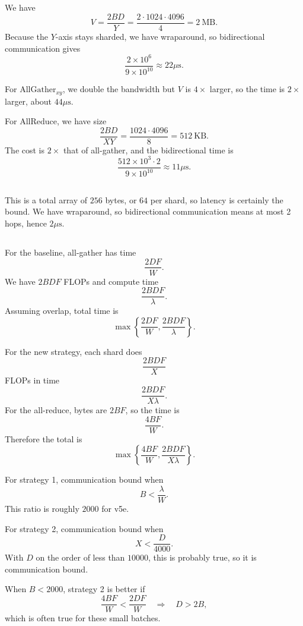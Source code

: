 \documentclass[11pt]{article}
\newcommand{\B}{B}
\newcommand{\D}{D}
\newcommand{\F}{F}
\newcommand{\W}{W}
\newcommand{\lam}{\lambda}
\newcommand{\us}{\mu\mathrm{s}}
\newcommand{\exercisebreak}{\Needspace{8\baselineskip}}
\begin{document}
\exercisebreak
\subsection{}
We have
\[
  V=\frac{2\B\D}{Y}
  =
  \frac{2\cdot 1024\cdot 4096}{4}
  =
  2\ \mathrm{MB}.
\]
Because the $Y$-axis stays sharded, we have wraparound, so bidirectional communication gives
\[
  \frac{2\times 10^6}{9\times 10^{10}}\approx 22\us.
\]

For $\mathrm{AllGather}_{xy}$, we double the bandwidth but $V$ is $4\times$ larger, so the time is $2\times$ larger, about $44\us$.

For $\mathrm{AllReduce}$, we have size
\[
  \frac{2\B\D}{XY}
  =
  \frac{1024\cdot 4096}{8}
  =
  512\ \mathrm{KB}.
\]
The cost is $2\times$ that of all-gather, and the bidirectional time is
\[
  \frac{512\times 10^3\cdot 2}{9\times 10^{10}}\approx 11\us.
\]

\exercisebreak
\subsection{}
This is a total array of $256$ bytes, or $64$ per shard, so latency is certainly the bound. We have wraparound, so bidirectional communication means at most 2 hops, hence $2\us$.

\exercisebreak
\subsection{}
For the baseline, all-gather has time
\[
  \frac{2\D\F}{\W}.
\]
We have $2\B\D\F$ FLOPs and compute time
\[
  \frac{2\B\D\F}{\lam}.
\]
Assuming overlap, total time is
\[
  \max\left\{\frac{2\D\F}{\W},\frac{2\B\D\F}{\lam}\right\}.
\]

For the new strategy, each shard does
\[
  \frac{2\B\D\F}{X}
\]
FLOPs in time
\[
  \frac{2\B\D\F}{X\lam}.
\]
For the all-reduce, bytes are $2\B\F$, so the time is
\[
  \frac{4\B\F}{\W}.
\]
Therefore the total is
\[
  \max\left\{\frac{4\B\F}{\W},\frac{2\B\D\F}{X\lam}\right\}.
\]

For strategy 1, communication bound when
\[
  \B < \frac{\lam}{\W}.
\]
This ratio is roughly $2000$ for v5e.

For strategy 2, communication bound when
\[
  X < \frac{\D}{4000}.
\]
With $\D$ on the order of less than $10000$, this is probably true, so it is communication bound.

When $\B<2000$, strategy 2 is better if
\[
  \frac{4\B\F}{\W}<\frac{2\D\F}{\W}
  \quad\Longrightarrow\quad
  \D>2\B,
\]
which is often true for these small batches.
\end{document}
